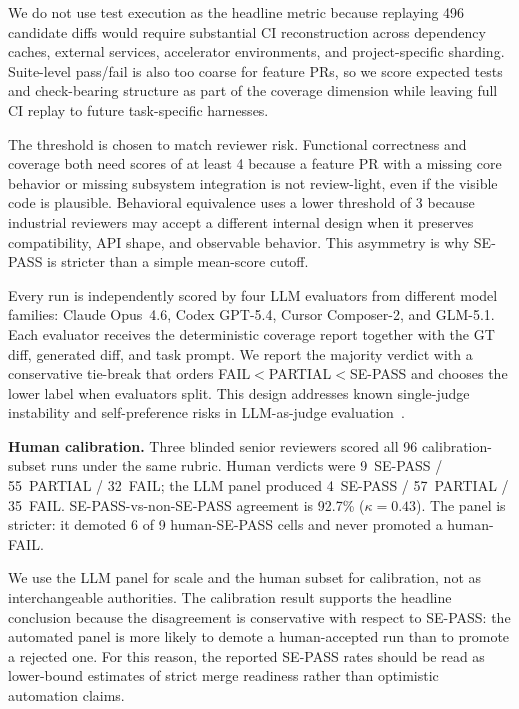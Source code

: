 We do not use test execution as the headline metric because replaying 496 candidate diffs would require substantial CI reconstruction across dependency caches, external services, accelerator environments, and project-specific sharding. Suite-level pass/fail is also too coarse for feature PRs, so we score expected tests and check-bearing structure as part of the coverage dimension while leaving full CI replay to future task-specific harnesses.

The threshold is chosen to match reviewer risk. Functional correctness and coverage both need scores of at least 4 because a feature PR with a missing core behavior or missing subsystem integration is not review-light, even if the visible code is plausible. Behavioral equivalence uses a lower threshold of 3 because industrial reviewers may accept a different internal design when it preserves compatibility, API shape, and observable behavior. This asymmetry is why SE-PASS is stricter than a simple mean-score cutoff.

Every run is independently scored by four LLM evaluators from different model families: Claude Opus~4.6, Codex GPT-5.4, Cursor Composer-2, and GLM-5.1. Each evaluator receives the deterministic coverage report together with the GT diff, generated diff, and task prompt. We report the majority verdict with a conservative tie-break that orders FAIL$<$PARTIAL$<$SE-PASS and chooses the lower label when evaluators split. This design addresses known single-judge instability and self-preference risks in LLM-as-judge evaluation~\cite{gu2024llmjudgesurvey,thakur2024judgingjudges,jung2024trustescalate,wataoka2024selfpreference}.

\textbf{Human calibration.}
Three blinded senior reviewers scored all 96 calibration-subset runs under the same rubric. Human verdicts were 9~SE-PASS / 55~PARTIAL / 32~FAIL; the LLM panel produced 4~SE-PASS / 57~PARTIAL / 35~FAIL. SE-PASS-vs-non-SE-PASS agreement is 92.7\% ($\kappa{=}0.43$). The panel is stricter: it demoted 6 of 9 human-SE-PASS cells and never promoted a human-FAIL.

We use the LLM panel for scale and the human subset for calibration, not as interchangeable authorities. The calibration result supports the headline conclusion because the disagreement is conservative with respect to SE-PASS: the automated panel is more likely to demote a human-accepted run than to promote a rejected one. For this reason, the reported SE-PASS rates should be read as lower-bound estimates of strict merge readiness rather than optimistic automation claims.

